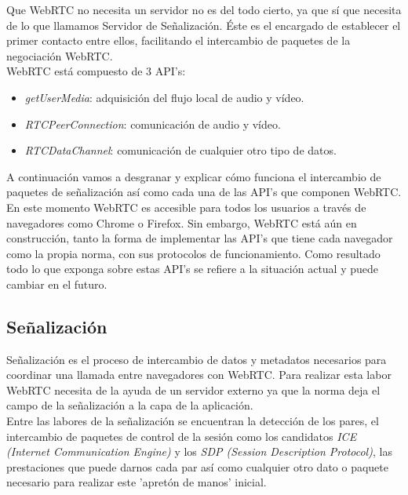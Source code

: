 Que WebRTC no necesita un servidor no es del todo cierto, ya que sí que necesita de lo que llamamos Servidor de Señalización. Éste es el encargado de establecer el primer contacto entre ellos, facilitando el intercambio de paquetes de la negociación WebRTC.\\

\noindent WebRTC está compuesto de 3 API's:

\begin{itemize}
\item \emph{getUserMedia}: adquisición del flujo local de audio y vídeo.
\item \emph{RTCPeerConnection}: comunicación de audio y vídeo.
\item \emph{RTCDataChannel}: comunicación de cualquier otro tipo de datos.
\end{itemize}

A continuación vamos a desgranar y explicar cómo funciona el intercambio de paquetes de señalización así como cada una de las API's que componen WebRTC.\\

En este momento WebRTC es accesible para todos los usuarios a través de navegadores como Chrome o Firefox. Sin embargo, WebRTC está aún en construcción, tanto la forma de implementar las API's que tiene cada navegador como la propia norma, con sus protocolos de funcionamiento. Como resultado todo lo que exponga sobre estas API's se refiere a la situación actual y puede cambiar en el futuro.\\



\subsection{Señalización} 
\label{subsec:senalizacion}

Señalización es el proceso de intercambio de datos y metadatos necesarios para coordinar una llamada entre navegadores con WebRTC. Para realizar esta labor WebRTC necesita de la ayuda de un servidor externo ya que la norma deja el campo de la señalización a la capa de la aplicación.\\

Entre las labores de la señalización se encuentran la detección de los pares, el intercambio de paquetes de control de la sesión como los candidatos \emph{ICE (Internet Communication Engine)} y los \emph{SDP (Session Description Protocol)}, las prestaciones que puede darnos cada par así como cualquier otro dato o paquete necesario para realizar este 'apretón de manos' inicial.\\

